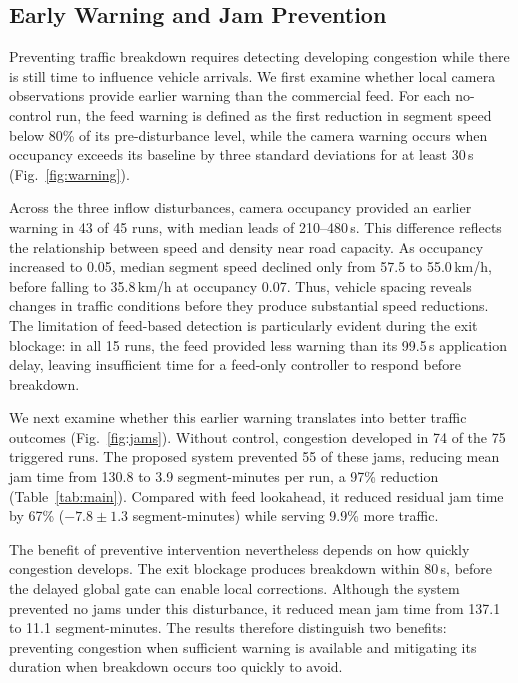 \documentclass[letterpaper, 10pt, journal, twoside]{IEEEtran}
\begin{document}
\subsection{Early Warning and Jam Prevention}

\label{sec:warn}

\label{sec:prevent}

Preventing traffic breakdown requires detecting developing congestion while there is still time to influence vehicle arrivals. We first examine whether local camera observations provide earlier warning than the commercial feed. For each no-control run, the feed warning is defined as the first reduction in segment speed below 80\% of its pre-disturbance level, while the camera warning occurs when occupancy exceeds its baseline by three standard deviations for at least 30\,s (Fig.~\ref{fig:warning}).

Across the three inflow disturbances, camera occupancy provided an earlier warning in 43 of 45 runs, with median leads of 210--480\,s. This difference reflects the relationship between speed and density near road capacity. As occupancy increased to 0.05, median segment speed declined only from 57.5 to 55.0\,km/h, before falling to 35.8\,km/h at occupancy 0.07. Thus, vehicle spacing reveals changes in traffic conditions before they produce substantial speed reductions. The limitation of feed-based detection is particularly evident during the exit blockage: in all 15 runs, the feed provided less warning than its 99.5\,s application delay, leaving insufficient time for a feed-only controller to respond before breakdown.

We next examine whether this earlier warning translates into better traffic outcomes (Fig.~\ref{fig:jams}). Without control, congestion developed in 74 of the 75 triggered runs. The proposed system prevented 55 of these jams, reducing mean jam time from 130.8 to 3.9 segment-minutes per run, a 97\% reduction (Table~\ref{tab:main}). Compared with feed lookahead, it reduced residual jam time by 67\% ($-7.8\pm1.3$ segment-minutes) while serving 9.9\% more traffic.

The benefit of preventive intervention nevertheless depends on how quickly congestion develops. The exit blockage produces breakdown within 80\,s, before the delayed global gate can enable local corrections. Although the system prevented no jams under this disturbance, it reduced mean jam time from 137.1 to 11.1 segment-minutes. The results therefore distinguish two benefits: preventing congestion when sufficient warning is available and mitigating its duration when breakdown occurs too quickly to avoid.
\end{document}
